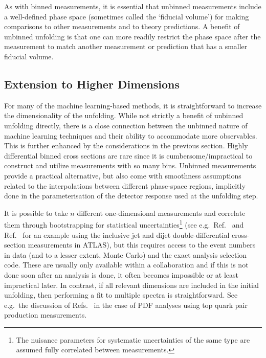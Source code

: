 \documentclass[a4paper,11pt]{article}
\begin{document}
As with binned measurements, it is essential that unbinned measurements include a well-defined phase space (sometimes called the `fiducial volume') for making comparisons to other measurements and to theory predictions.   A benefit of unbinned unfolding is that one can more readily restrict the phase space after the measurement to match another measurement or prediction that has a smaller fiducial volume. 

\subsection{Extension to Higher Dimensions}

For many of the machine learning-based methods, it is straightforward to increase the dimensionality of the unfolding.  While not strictly a benefit of unbinned unfolding directly, there is a close connection between the unbinned nature of machine learning techniques and their ability to accommodate more observables.  This is further enhanced by the considerations in the previous section.  Highly differential binned cross sections are rare since it is cumbersome/impractical to construct and utilize measurements with so many bins. Unbinned measurements provide a practical alternative, but also come with smoothness assumptions related to the interpolations between different phase-space regions, implicitly done in the parameterisation of the detector response used at the unfolding step.

It is possible to take $n$ different one-dimensional measurements and correlate them through bootstrapping for statistical uncertainties\footnote{The nuisance parameters for systematic uncertainties of the same type are assumed fully correlated between measurements.} (see e.g.\ Ref.~\cite{ATL-PHYS-PUB-2021-011} and Ref.~\cite{ATLAS:2017ble} for an example using the inclusive jet and dijet double-differential cross-section measurements in ATLAS), but this requires access to the event numbers in data (and to a lesser extent, Monte Carlo) and the exact analysis selection code.  These are usually only available within a collaboration and if this is not done soon after an analysis is done, it often becomes impossible or at least impractical later.   In contrast, if all relevant dimensions are included in the initial unfolding, then performing a fit to multiple spectra is straightforward.  See e.g.\ the discussion of Refs.~\cite{Czakon:2016olj,Bailey:2019yze,Hou:2019efy} in the case
of PDF analyses using top quark pair production
measurements.
\end{document}
